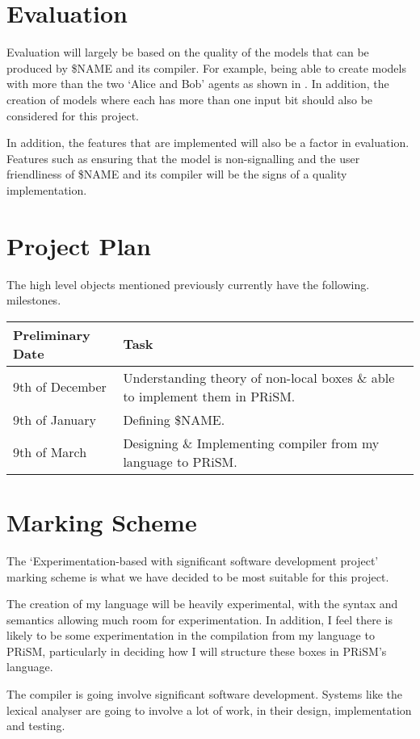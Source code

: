 \documentclass[11pt, a4paper]{article}
\begin{document}

\section{Evaluation} %
\label{sec:evaluation}

Evaluation will largely be based on the quality of the models that can be
produced by \$NAME and its compiler. For example, being able to create models
with more than the two `Alice and Bob' agents as shown in 
\cite[Definition~1]{nlb_lamontague}. In addition, the creation of models where
each has more than one input bit should also be considered for this project.

In addition, the features that are implemented will also be a factor in
evaluation. Features such as ensuring that the model is non-signalling and
the user friendliness of \$NAME and its compiler will be the signs of a quality 
implementation.


\section{Project Plan} %
\label{sec:project_plan}
The high level objects mentioned previously currently have the following.
milestones.

\begin{center}
    \begin{tabular}{l | p{7.5cm}}
        Preliminary Date & Task \\
        \hline
        9th of December & Understanding theory of non-local boxes \& able to
        implement them in PRiSM. \\

        9th of January & Defining \$NAME. \\

        9th of March & Designing \& Implementing compiler from my language to
        PRiSM. \\
\end{tabular}
\end{center}


\section{Marking Scheme} %
\label{sec:marking_scheme}
The `Experimentation-based with significant software development project'
marking scheme is what we have decided to be most suitable for this project.

The creation of my language will be heavily experimental, with the syntax and
semantics allowing much room for experimentation. In addition, I feel there is
likely to be some experimentation in the compilation from my language to PRiSM,
particularly in deciding how I will structure these boxes in PRiSM's language.

The compiler is going involve significant software development. Systems like the
lexical analyser are going to involve a lot of work, in their design,
implementation and testing. 

\newpage
\printbibliography
\end{document}
